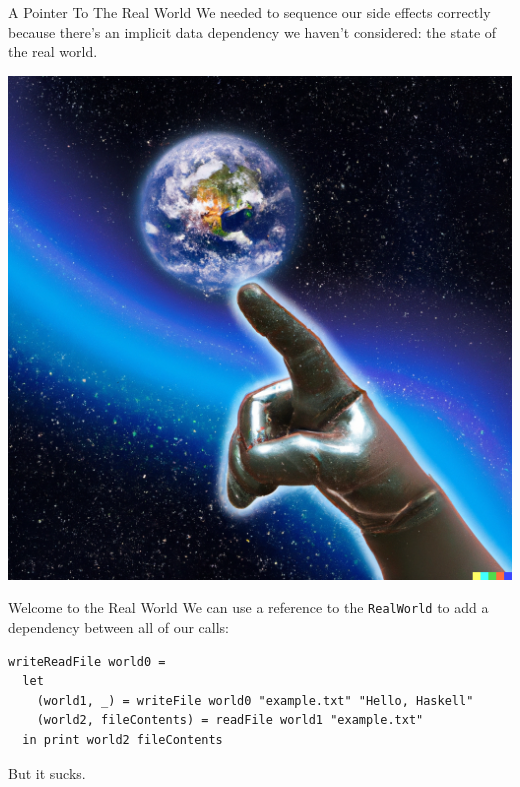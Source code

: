 \documentclass[10pt, presentation, colorlinks]{beamer}
\begin{document}
\begin{frame}[label={sec:orgb40fff3}]{A Pointer To The Real World}
We needed to \alert{sequence} our side effects correctly because there's an implicit data dependency we haven't considered: \alert{the state of the real world}.

\bigskip
\pause
\begin{center}
\includegraphics[height=0.4\textheight]{./img/pointing-to-the-real-world.png}
\end{center}
\end{frame}

\begin{frame}[label={sec:org464cc12},fragile]{Welcome to the Real World}
 We can use a reference to the \texttt{RealWorld} to add a dependency between all of our calls:

\bigskip
\pause

\begin{verbatim}
writeReadFile world0 =
  let
    (world1, _) = writeFile world0 "example.txt" "Hello, Haskell"
    (world2, fileContents) = readFile world1 "example.txt"
  in print world2 fileContents
\end{verbatim}

\bigskip
\pause

But it sucks.
\end{frame}
\end{document}
